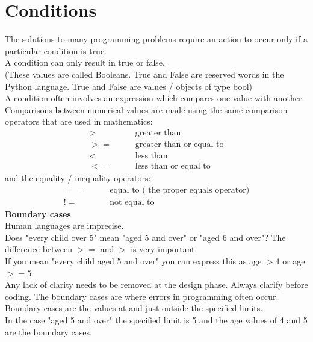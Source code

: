 \documentclass[a4paper,12pt]{article}
\begin{document}
\section{Conditions}
The solutions to many programming problems require an action to occur only if a particular condition is true.\\ 
A condition can only result in true or false. \\
(These values are called Booleans. True and False are reserved words in the Python language. True and False are values / objects of type bool)\\
A condition often involves an expression which compares one value with another.\\
Comparisons between numerical values are made using the same comparison operators that are used in mathematics:\\
\begin{align*}
> & \text{~~~~~~greater than}\\
>= & \text{~~~~~~greater than or equal to}\\
< & \text{~~~~~~less than}\\
<= & \text{~~~~~~less than or equal to}
\end{align*}
 and the equality / inequality operators:
 \begin{align*}
 ==  & \text{~~~~~~equal to ( the proper equals operator)}\\
 != & \text{~~~~~~not equal to}
 \end{align*}
\textbf{Boundary cases}\\
Human languages are imprecise. \\
Does "every child over 5" mean "aged 5 and over" or "aged 6 and over"? The difference between $>=$ and $>$ is very important. \\
If you mean "every child aged 5 and over" you can express this as age $> 4$ or age $>= 5$.\\
Any lack of clarity needs to be removed at the design phase. Always clarify before
coding. The boundary cases are where errors in programming often occur.\\
 Boundary cases are the values at and just outside the specified limits.\\
 In the case "aged 5 and over" the specified limit is 5 and the age values of 4 and 5 are the boundary cases.
 \newpage
\end{document}

